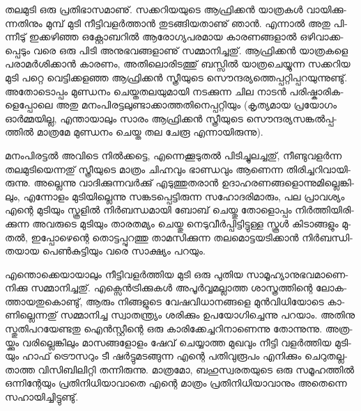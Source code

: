 \vskip 2pt

ത­ല­മു­ടി ഒരു പ്ര­തി­ഭാ­സ­മാ­ണു്. സക്ക­റി­യ­യു­ടെ ആഫ്രി­ക്കന്‍ യാ­ത്ര­കള്‍ വാ­യി­ക്കു­ന്ന­തി­നും മു­മ്പ് മു­ടി നീ­ട്ടി­വ­ളര്‍­ത്താന്‍ 
തു­ട­ങ്ങി­യ­താ­ണു് ഞാന്‍. എന്നാല്‍ അതു പി­ന്നീ­ടു് ഇക്ക­ഴി­ഞ്ഞ ഒക്റ്റോ­ബ­റില്‍ ആരോ­ഗ്യ­പ­ര­മായ കാ­ര­ണ­ങ്ങ­ളാല്‍ 
ഒഴി­വാ­ക്ക­പ്പെ­ടും വരെ ഒരു പി­ടി അനു­ഭ­വ­ങ്ങ­ളാ­ണു് സമ്മാ­നി­ച്ച­തു്. ആഫ്രി­ക്കന്‍ യാ­ത്ര­ക­ളെ പരാ­മര്‍­ശി­ക്കാന്‍ കാ­ര­ണം, 
അതി­ലൊ­രി­ട­ത്തു് ബസ്സില്‍ യാ­ത്ര­ചെ­യ്യു­ന്ന ­സ­ക്ക­റി­യ മു­ടി പറ്റെ വെ­ട്ടി­ക്ക­ള­ഞ്ഞ ആഫ്രി­ക്കന്‍ സ്ത്രീ­യു­ടെ 
സൌ­ന്ദ­ര്യ­ത്തെ­പ്പ­റ്റി­പ്പ­റ­യു­ന്നു­ണ്ടു്. അതോ­ടൊ­പ്പം മു­ണ്ഡ­നം ചെ­യ്ത­ത­ല­യു­മാ­യി നട­ക്കു­ന്ന ചില നാ­ടന്‍ 
പരി­ഷ്കാ­രി­ക­ളെ­പ്പോ­ലെ അതു മനം­പി­ര­ട്ട­ലു­ണ്ടാ­ക്കാ­ത്ത­തി­നെ­പ്പ­റ്റി­യും (കൃ­ത്യ­മായ പ്ര­യോ­ഗം ഓര്‍­മ്മ­യി­ല്ല, എന്താ­യാ­ലും 
സാ­രം ആഫ്രി­ക്കന്‍ സ്ത്രീ­യു­ടെ സൌ­ന്ദ­ര്യ­സ­ങ്കല്‍­പ്പ­ത്തില്‍ മാ­ത്ര­മേ മു­ണ്ഡ­നം ചെ­യ്ത തല ചേ­രൂ എന്നാ­യി­രു­ന്നു­).

­മ­നം­പി­ര­ട്ടല്‍ അവി­ടെ നില്‍­ക്ക­ട്ടെ, എന്നെ­ക്കൂ­ടു­തല്‍ പി­ടി­ച്ചു­ല­ച്ച­തു്, നീ­ണ്ടു­വ­ളര്‍­ന്ന തല­മു­ടി­യെ­ന്ന­തു് സ്ത്രീ­യു­ടെ മാ­ത്രം ചി­ഹ്ന­വും 
ഭാ­ണ്ഡ­വും ആണെ­ന്ന തി­രി­ച്ച­റി­വാ­യി­രു­ന്നു. അല്ലെ­ന്നു വാ­ദി­ക്കു­ന്ന­വര്‍­ക്കു് എടു­ത്തു­ത­രാന്‍ ഉദാ­ഹ­ര­ണ­ങ്ങ­ളൊ­ന്നു­മി­ല്ലെ­ങ്കി­ലും, 
എന്നോ­ളം മു­ടി­യി­ല്ലെ­ന്നു സങ്ക­ട­പ്പെ­ട്ടി­രു­ന്ന സഹോ­ദ­രി­മാ­രും, പല പ്രാ­വ­ശ്യം എന്റെ മു­ടി­യും സ്കൂ­ളില്‍ നിര്‍­ബ­ന്ധ­മാ­യി ബോ­ബ് 
ചെ­യ്തു തോ­ളൊ­പ്പം നിര്‍­ത്തി­യി­രി­ക്കു­ന്ന അവ­രു­ടെ മു­ടി­യും താ­ര­ത­മ്യം ചെ­യ്തു നെ­ടു­വീര്‍­പ്പി­ട്ടി­ട്ടു­ള്ള സ്കൂള്‍ കി­ടാ­ങ്ങ­ളും മു­തല്‍, 
ഇപ്പോ­ഴെ­ന്റെ തൊ­ട്ട­പ്പു­റ­ത്തു താ­മ­സി­ക്കു­ന്ന തല­മൊ­ട്ട­യ­ടി­ക്കാന്‍ നിര്‍­ബ­ന്ധി­ത­യായ പെണ്‍­കു­ട്ടി­യും വരെ സാ­ക്ഷ്യം പറ­യും­.

എ­ന്തൊ­ക്കെ­യാ­യാ­ലും നീ­ട്ടി­വ­ളര്‍­ത്തിയ മു­ടി ഒരു പു­തിയ സാ­മൂ­ഹ്യാ­നു­ഭ­വ­മാ­ണെ­നി­ക്കു സമ്മാ­നി­ച്ച­തു്. എക്സെന്‍­ട്രി­ക്കു­കള്‍ 
അപൂര്‍­വ്വ­മ­ല്ലാ­ത്ത ശാ­സ്ത്ര­ത്തി­ന്റെ ലോ­ക­ത്താ­യ­തു­കൊ­ണ്ടു്, ആരും നി­ങ്ങ­ളു­ടെ വേ­ഷ­വി­ധാ­ന­ങ്ങ­ളെ മുന്‍­വി­ധി­യോ­ടെ 
കാ­ണി­ല്ലെ­ന്ന­തു് സമ്മാ­നി­ച്ച സ്വാ­ത­ന്ത്ര്യം ശരി­ക്കും ഉപ­യോ­ഗി­ച്ചെ­ന്നു പറ­യാം. അതി­നു സ്തു­തി­പ­റ­യേ­ണ്ട­തു ഐന്‍­സ്റ്റീ­ന്റെ 
ഒരു കാ­രി­ക്കേ­ച്ച­റി­നാ­ണെ­ന്നു തോ­ന്നു­ന്നു. അത്ര­യ്ക്കും വരി­ല്ലെ­ങ്കി­ലും മാ­സ­ങ്ങ­ളോ­ളം ഷേ­വ് ചെ­യ്യാ­ത്ത മു­ഖ­വും നീ­ട്ടി വളര്‍­ത്തിയ 
മു­ടി­യും ഹാ­ഫ് ട്രൌ­സ­റും ടീ ഷര്‍­ട്ടു­മ­ട­ങ്ങു­ന്ന എന്റെ പതി­വു­രൂ­പം എനി­ക്കും ചെ­റു­ത­ല്ല­താ­ത്ത വി­സി­ബി­ലി­റ്റി തന്നി­രു­ന്നു. 
മാ­ത്ര­മോ, ബഹു­സ്വ­ര­ത­യു­ടെ ഒരു സമൂ­ഹ­ത്തില്‍ ഒന്നി­ന്റേ­യും പ്ര­തി­നി­ധി­യാ­വാ­തെ എന്റെ മാ­ത്രം പ്ര­തി­നി­ധി­യാ­വാ­നും 
അതെ­ന്നെ സഹാ­യി­ച്ചി­ട്ടു­ണ്ടു്.

